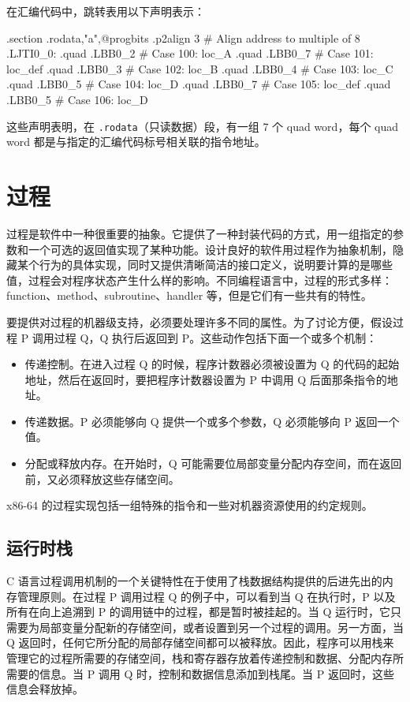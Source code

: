在汇编代码中，跳转表用以下声明表示：
\begin{gascode}
    .section    .rodata,"a",@progbits
    .p2align    3       # Align address to multiple of 8
.LJTI0_0:
    .quad   .LBB0_2     # Case 100: loc_A
    .quad   .LBB0_7     # Case 101: loc_def
    .quad   .LBB0_3     # Case 102: loc_B
    .quad   .LBB0_4     # Case 103: loc_C
    .quad   .LBB0_5     # Case 104: loc_D
    .quad   .LBB0_7     # Case 105: loc_def
    .quad   .LBB0_5     # Case 106: loc_D
\end{gascode}
这些声明表明，在 \verb|.rodata|（只读数据）段，有一组 7 个 quad word，每个 quad word 都是与指定的汇编代码标号相关联的指令地址。

\section{过程}

过程是软件中一种很重要的抽象。它提供了一种封装代码的方式，用一组指定的参数和一个可选的返回值实现了某种功能。设计良好的软件用过程作为抽象机制，隐藏某个行为的具体实现，同时又提供清晰简洁的接口定义，说明要计算的是哪些值，过程会对程序状态产生什么样的影响。不同编程语言中，过程的形式多样：function、method、subroutine、handler 等，但是它们有一些共有的特性。

要提供对过程的机器级支持，必须要处理许多不同的属性。为了讨论方便，假设过程 P 调用过程 Q，Q 执行后返回到 P。这些动作包括下面一个或多个机制：
\begin{itemize}
    \item 传递控制。在进入过程 Q 的时候，程序计数器必须被设置为 Q 的代码的起始地址，然后在返回时，要把程序计数器设置为 P 中调用 Q 后面那条指令的地址。
    \item 传递数据。P 必须能够向 Q 提供一个或多个参数，Q 必须能够向 P 返回一个值。
    \item 分配或释放内存。在开始时，Q 可能需要位局部变量分配内存空间，而在返回前，又必须释放这些存储空间。
\end{itemize}

x86-64 的过程实现包括一组特殊的指令和一些对机器资源使用的约定规则。

\subsection{运行时栈}

C 语言过程调用机制的一个关键特性在于使用了栈数据结构提供的后进先出的内存管理原则。在过程 P 调用过程 Q 的例子中，可以看到当 Q 在执行时，P 以及所有在向上追溯到 P 的调用链中的过程，都是暂时被挂起的。当 Q 运行时，它只需要为局部变量分配新的存储空间，或者设置到另一个过程的调用。另一方面，当 Q 返回时，任何它所分配的局部存储空间都可以被释放。因此，程序可以用栈来管理它的过程所需要的存储空间，栈和寄存器存放着传递控制和数据、分配内存所需要的信息。当 P 调用 Q 时，控制和数据信息添加到栈尾。当 P 返回时，这些信息会释放掉。

